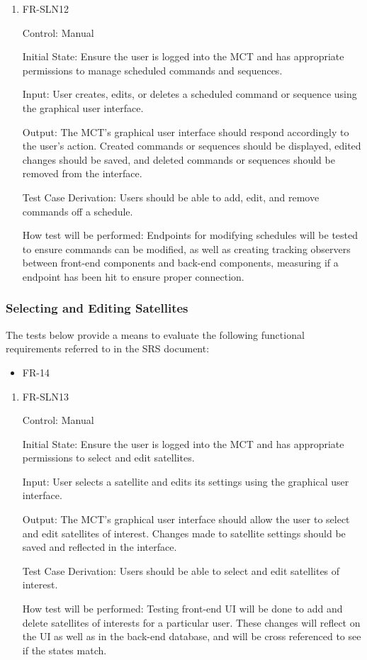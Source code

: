 \documentclass[12pt, titlepage]{article}
\begin{document}
\begin{enumerate}

\item{FR-SLN12\\}

Control: Manual
					
Initial State: Ensure the user is logged into the MCT and has appropriate permissions to manage scheduled commands and sequences.
	
Input: User creates, edits, or deletes a scheduled command or sequence using the graphical user interface.
					
Output: The MCT's graphical user interface should respond accordingly to the user's action. Created commands or sequences should be displayed, edited changes should be saved, and deleted commands or sequences should be removed from the interface.

Test Case Derivation: Users should be able to add, edit, and remove commands off a schedule.
					
How test will be performed: Endpoints for modifying schedules will be tested to ensure commands can be modified, as well as creating tracking observers between front-end components and back-end components, measuring if a endpoint has been hit to ensure proper connection.

\end{enumerate}

\subsubsection{Selecting and Editing Satellites}

The tests below provide a means to evaluate the following functional requirements referred to in the SRS document:
\begin{itemize}
    \item FR-14
\end{itemize}

\begin{enumerate}

\item{FR-SLN13\\}

Control: Manual
					
Initial State: Ensure the user is logged into the MCT and has appropriate permissions to select and edit satellites.
	
Input: User selects a satellite and edits its settings using the graphical user interface.
					
Output: The MCT's graphical user interface should allow the user to select and edit satellites of interest. Changes made to satellite settings should be saved and reflected in the interface.

Test Case Derivation: Users should be able to select and edit satellites of interest.
					
How test will be performed: Testing front-end UI will be done to add and delete satellites of interests for a particular user. These changes will reflect on the UI as well as in the back-end database, and will be cross referenced to see if the states match.

\end{enumerate}
\end{document}
